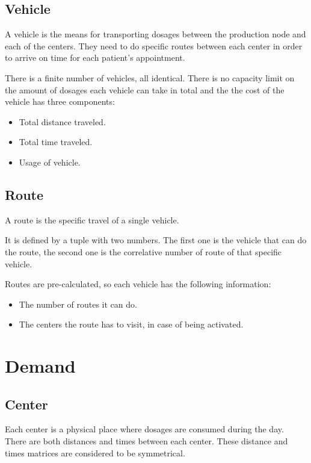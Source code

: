 \subsection{Vehicle}

A vehicle is the means for transporting dosages between the production node and each of the centers. They need to do specific routes between each center in order to arrive on time for each patient's appointment.

There is a finite number of vehicles, all identical. There is no capacity limit on the amount of dosages each vehicle can take in total and the the cost of the vehicle has three components:

\begin{itemize}
	\item Total distance traveled.
	\item Total time traveled.
	\item Usage of vehicle.
\end{itemize}

\subsection{Route}
\label{def:route}

A route is the specific travel of a single vehicle.

It is defined by a tuple with two numbers. The first one is the vehicle that can do the route, the second one is the correlative number of route of that specific vehicle.

Routes are pre-calculated, so each vehicle has the following information:

\begin{itemize}
	\item The number of routes it can do.
	\item The centers the route has to visit, in case of being activated.
\end{itemize}


\section{Demand}

\subsection{Center}

Each center is a physical place where dosages are consumed during the day. There are both distances and times between each center. These distance and times matrices are considered to be symmetrical.

